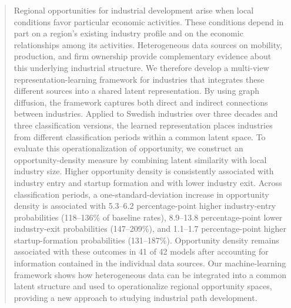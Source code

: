 \documentclass[9pt,twocolumn,twoside]{pnas-new}
\begin{document}
\begin{abstract}
Regional opportunities for industrial development arise when local conditions favor particular economic activities. These conditions depend in part on a region's existing industry profile and on the economic relationships among its activities. Heterogeneous data sources on mobility, production, and firm ownership provide complementary evidence about this underlying industrial structure. We therefore develop a multi-view representation-learning framework for industries that integrates these different sources into a shared latent representation. By using graph diffusion, the framework captures both direct and indirect connections between industries. Applied to Swedish industries over three decades and three classification versions, the learned representation places industries from different classification periods within a common latent space. To evaluate this operationalization of opportunity, we construct an opportunity-density measure by combining latent similarity with local industry size. Higher opportunity density is consistently associated with industry entry and startup formation and with lower industry exit. Across classification periods, a one-standard-deviation increase in opportunity density is associated with 5.3--6.2 percentage-point higher industry-entry probabilities (118--136\% of baseline rates), 8.9--13.8 percentage-point lower industry-exit probabilities (147--209\%), and 1.1--1.7 percentage-point higher startup-formation probabilities (131--187\%). Opportunity density remains associated with these outcomes in 41 of 42 models after accounting for information contained in the individual data sources. Our machine-learning framework shows how heterogeneous data can be integrated into a common latent structure and used to operationalize regional opportunity spaces, providing a new approach to studying industrial path development.
\end{abstract}



\maketitle
\thispagestyle{firststyle}

\Firstpage

\end{document}
